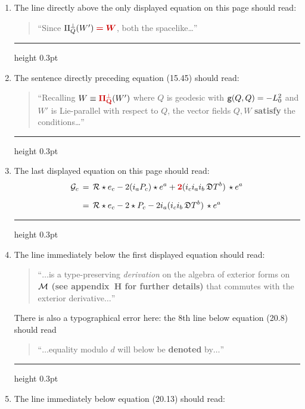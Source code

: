 \documentclass[12pt]{GeomPhysBOOK}
\newcommand\correct[1]{{\color{red!80!black}\bf #1}}
\newcommand\mcorrect[1]{{\color{red!80!black}\bm{#1}}}
\newcommand\listrule{\vspace{0.2cm}\hrule height 0.3pt}
\begin{document}
\begin{enumerate}[leftmargin=1.9cm,labelwidth=1.4cm,itemsep=0.5cm]
	\listrule
	\item[\underline{page 285}:]
		The line directly above the only displayed equation on this page should read:
		\begin{quote}
			``Since $\Pi_{Q}^{\perp}(W')\mcorrect{\;=W}$, both the spacelike\ldots'' \\
		\end{quote}
	\listrule
	\item[\underline{page 290}:]
		The sentence directly preceding equation (15.45) should read:
		\begin{quote}
			``Recalling $W\equiv \correct{\Pi_{Q}^{\perp}}(W')$ where $Q$ is geodesic with $\texttt{g}(Q,Q)=-L_{0}^{2}$ and $W'$ is Lie-parallel with respect to $Q$, the vector fields $Q,W$ \correct{satisfy} the conditions\ldots'' \\
		\end{quote}
	\listrule
	\item[\underline{page 376}:] 	
		The last displayed equation on this page should read:
		\begin{align*}
			\EINFM{c} &\,=\, \mathcal{R}\star e_{c} - 2(i_{a}P_{c})\star e^{a} + \correct{2}(i_{c}i_{a}i_{b}\,\GLD T^{b})\, \star e^{a} \\[0.2cm]
				&\,=\, \mathcal{R}\star e_{c} - 2\star P_{c} - 2i_{a}(i_{c}i_{b}\,\GLD T^{b})\, \star e^{a} 
		\end{align*}
	\listrule
	\item[\underline{page 380}:]
		The line immediately below the first displayed equation should read:
		\begin{quote}
			``$\ldots$is a type-preserving {\it derivation} on the algebra of exterior forms on $\mathcal{M}$ \correct{(see appendix~H for further details)} that commutes with the exterior derivative$\ldots$''\\[-0.2cm]
		\end{quote}
		There is also a typographical error here: the $8$th line below equation (20.8) should read
		\begin{quote}
			``$\ldots$equality modulo $d$ will below be \correct{denoted} by$\ldots$''\\
		\end{quote}
	\listrule
	\item[\underline{page 382}:] 	
		The line immediately below equation (20.13) should read:

\end{enumerate}
\end{document}
